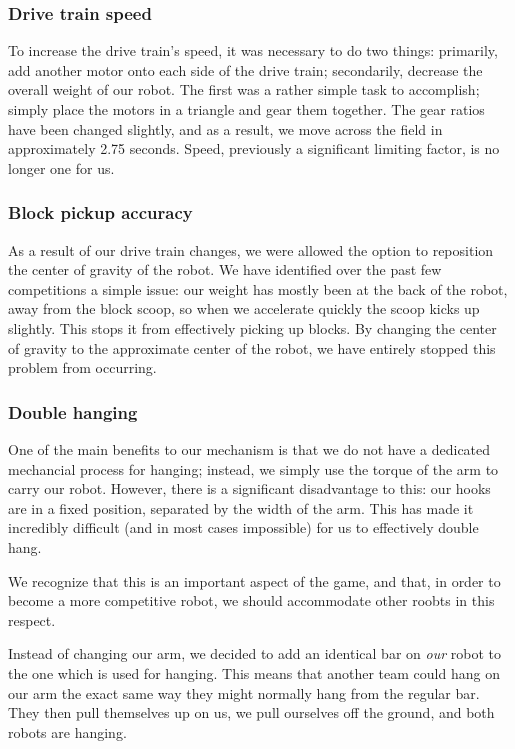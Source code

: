 \subsubsection{Drive train speed}

To increase the drive train's speed, it was necessary to do two things: primarily, add another motor onto each side of the drive train; secondarily, decrease the overall weight of our robot. The first was a rather simple task to accomplish; simply place the motors in a triangle and gear them together. The gear ratios have been changed slightly, and as a result, we move across the field in approximately 2.75 seconds. Speed, previously a significant limiting factor, is no longer one for us.

\subsubsection{Block pickup accuracy}

As a result of our drive train changes, we were allowed the option to reposition the center of gravity of the robot. We have identified over the past few competitions a simple issue: our weight has mostly been at the back of the robot, away from the block scoop, so when we accelerate quickly the scoop kicks up slightly. This stops it from effectively picking up blocks. By changing the center of gravity to the approximate center of the robot, we have entirely stopped this problem from occurring.

\subsubsection{Double hanging}

One of the main benefits to our mechanism is that we do not have a dedicated mechancial process for hanging; instead, we simply use the torque of the arm to carry our robot. However, there is a significant disadvantage to this: our hooks are in a fixed position, separated by the width of the arm. This has made it incredibly difficult (and in most cases impossible) for us to effectively double hang.

We recognize that this is an important aspect of the game, and that, in order to become a more competitive robot, we should accommodate other roobts in this respect. 

Instead of changing our arm, we decided to add an identical bar on \textit{our} robot to the one which is used for hanging. This means that another team could hang on our arm the exact same way they might normally hang from the regular bar. They then pull themselves up on us, we pull ourselves off the ground, and both robots are hanging.

